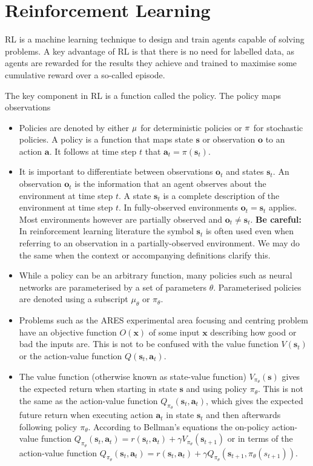 \section{Reinforcement Learning}

\Acf{RL} is a machine learning technique to design and train agents capable of solving problems. A key advantage of \ac{RL} is that there is no need for labelled data, as agents are rewarded for the results they achieve and trained to maximise some cumulative reward over a so-called episode.

The key component in \ac{RL} is a function called the policy. The policy maps observations

\begin{itemize}
    \item Policies are denoted by either $\mu$ for deterministic policies or $\pi$ for stochastic policies. A policy is a function that maps state $\bm{s}$ or observation $\bm{o}$ to an action $\bm{a}$. It follows at time step $t$ that $\bm{a}_t = \pi(\bm{s}_t)$.
    \item It is important to differentiate between observations $\bm{o}_t$ and states $\bm{s}_t$. An observation $\bm{o}_t$ is the information that an agent observes about the environment at time step $t$. A state $\bm{s}_t$ is a complete description of the environment at time step $t$. In fully-observed environments $\bm{o}_t = \bm{s}_t$ applies. Most environments however are partially observed and $\bm{o}_t \neq \bm{s}_t$. \textbf{Be careful:} In reinforcement learning literature the symbol $\bm{s}_t$ is often used even when referring to an observation in a partially-observed environment. We may do the same when the context or accompanying definitions clarify this.
    \item While a policy can be an arbitrary function, many policies such as neural networks are parameterised by a set of parameters $\theta$. Parameterised policies are denoted using a subscript $\mu_\theta$ or $\pi_\theta$.
    \item Problems such as the ARES experimental area focusing and centring problem have an objective function $O(\bm{x})$ of some input $\bm{x}$ describing how good or bad the inputs are. This is not to be confused with the value function $V(\bm{s}_t)$ or the action-value function $Q(\bm{s}_t, \bm{a}_t)$.
    \item The value function (otherwise known as state-value function) $V_{\pi_\theta}(\bm{s})$ gives the expected return when starting in state $\bm{s}$ and using policy $\pi_\theta$. This is not the same as the action-value function $Q_{\pi_\theta}(\bm{s}_t, \bm{a}_t)$, which gives the expected future return when executing action $\bm{a}_t$ in state $\bm{s}_t$ and then afterwards following policy $\pi_\theta$. According to Bellman's equations the on-policy action-value function $Q_{\pi_\theta}(\bm{s}_t, \bm{a}_t) = r(\bm{s}_t, \bm{a}_t) + \gamma V_{\pi_\theta}(\bm{s}_{t+1})$ or in terms of the action-value function $Q_{\pi_\theta}(\bm{s}_t, \bm{a}_t) = r(\bm{s}_t, \bm{a}_t) + \gamma Q_{\pi_\theta}(\bm{s}_{t+1}, \pi_\theta(s_{t+1}))$.

\end{itemize}
